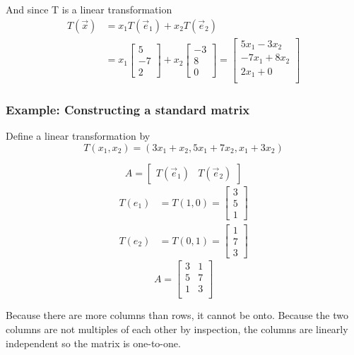 \documentclass[12pt]{article} %
\begin{document}
And since T is a linear transformation
\begin{align*}
	T(\vec{x}) &= x_1 T(\vec{e}_1) + x_2 T(\vec{e}_2)\\
	&= x_1 \begin{bmatrix}
		5\\-7\\2
	\end{bmatrix} + x_2\begin{bmatrix}
		-3\\8\\0
	\end{bmatrix} = \begin{bmatrix}
		5x_1 - 3x_2\\
		-7x_1 + 8x_2\\
		2x_1 + 0\\
	\end{bmatrix}
\end{align*}

\subsubsection{Example: Constructing a standard matrix}
Define a linear transformation by
$$T(x_1, x_2) = (3x_1 + x_2, 5x_1 + 7x_2, x_1 + 3x_2)$$

$$A = \begin{bmatrix}
	T(\vec{e}_1) & T(\vec{e}_2)
\end{bmatrix}$$
\begin{align*}
	T(e_1) &= T(1, 0) = \begin{bmatrix}
		3\\5\\1
	\end{bmatrix}\\
	T(e_2) &= T(0, 1) = \begin{bmatrix}
		1\\7\\3
	\end{bmatrix}
\end{align*} 
$$A = \begin{bmatrix}
		3 & 1\\
		5 & 7\\
		1 & 3\\
	\end{bmatrix}$$

Because there are more columns than rows, it cannot be onto.
Because the two columns are not multiples of each other by inspection, the columns are linearly independent so the matrix is one-to-one.
\end{document}
